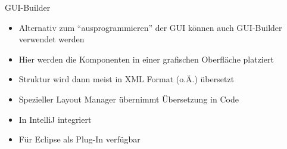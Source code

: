 \begin{frame}{GUI-Builder}{}
    \begin{itemize}
        \item Alternativ zum "`ausprogrammieren"' der GUI können auch GUI-Builder verwendet werden
        \item Hier werden die Komponenten in einer grafischen Oberfläche platziert
        \item Struktur wird dann meist in XML Format (o.Ä.) übersetzt
        \item Spezieller Layout Manager übernimmt Übersetzung in Code
        \item In IntelliJ integriert
        \item Für Eclipse als Plug-In verfügbar
    \end{itemize}
\end{frame}